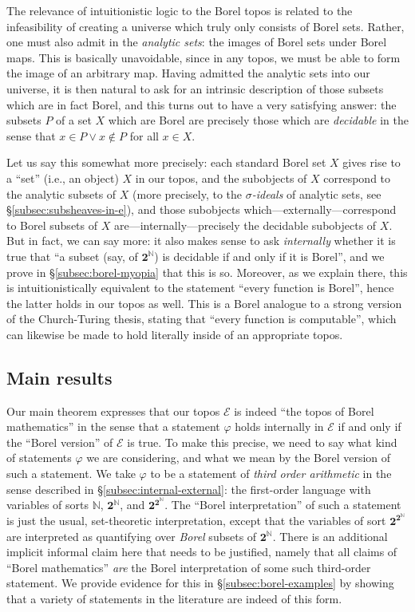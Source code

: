 \documentclass[11pt]{amsart}
\newcommand\cE{\mathcal{E}}
\newcommand{\N}{\mathbb{N}}
\renewcommand\phi{\varphi}
\newcommand\two{\mathbf{2}}
\theoremstyle{definition}
\theoremstyle{remark}
\theoremstyle{plain}
\begin{document}
The relevance of intuitionistic logic to the Borel topos is related to the infeasibility of creating a universe which truly only consists of Borel sets.
Rather, one must also admit in the \emph{analytic sets}: the images of Borel sets under Borel maps.
This is basically unavoidable, since in any topos, we must be able to form the image of an arbitrary map.
Having admitted the analytic sets into our universe, it is then natural to ask for an intrinsic description of those subsets which are in fact Borel, and this turns out to have a very satisfying answer: the subsets \( P \) of a set \( X \) which are Borel are precisely those which are \emph{decidable} in the sense that \( x \in P \vee x \notin P \) for all \( x \in X \).

Let us say this somewhat more precisely: each standard Borel set \( X \) gives rise to a ``set'' (i.e., an object) \( X \) in our topos, and the subobjects of \( X \) correspond to the analytic subsets of \( X \) (more precisely, to the \emph{\( \sigma \)-ideals} of analytic sets, see \S\ref{subsec:subsheaves-in-e}), and those subobjects which---externally---correspond to Borel subsets of \( X \) are---internally---precisely the decidable subobjects of \( X \).
But in fact, we can say more: it also makes sense to ask \emph{internally} whether it is true that ``a subset (say, of \( \two^\N \)) is decidable if and only if it is Borel'', and we prove in \S\ref{subsec:borel-myopia} that this is so.
Moreover, as we explain there, this is intuitionistically equivalent to the statement ``every function is Borel'', hence the latter holds in our topos as well.
This is a Borel analogue to a strong version of the Church-Turing thesis, stating that ``every function is computable'', which can likewise be made to hold literally inside of an appropriate topos.

\subsection{Main results}
Our main theorem expresses that our topos \( \cE \) is indeed ``the topos of Borel mathematics'' in the sense that a statement \( \phi \) holds internally in \( \cE \) if and only if the ``Borel version'' of \( \cE \) is true.
To make this precise, we need to say what kind of statements \( \phi \) we are considering, and what we mean by the Borel version of such a statement.
We take \( \phi \) to be a statement of \emph{third order arithmetic} in the sense described in \S\ref{subsec:internal-external}: the first-order language with variables of sorts \( \N \), \( \two^\N \), and \( \two^{\two^\N} \).
The ``Borel interpretation'' of such a statement is just the usual, set-theoretic interpretation, except that the variables of sort \( \two^{\two^\N} \) are interpreted as quantifying over \emph{Borel} subsets of \( \two^\N \).
There is an additional implicit informal claim here that needs to be justified, namely that all claims of ``Borel mathematics'' \emph{are} the Borel interpretation of some such third-order statement.
We provide evidence for this in \S\ref{subsec:borel-examples} by showing that a variety of statements in the literature are indeed of this form.
\end{document}
